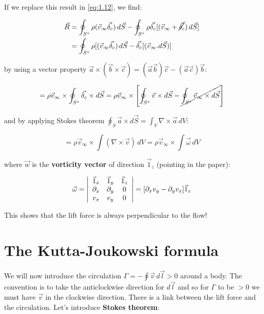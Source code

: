 			If we replace this result in \eqref{eq:1.12}, we find:
			
			\begin{equation}
			\begin{aligned}
			\vec{R} &= \oint _{S^*} \rho (\vec{v}_\infty \vec{\delta _c} ) \, d\vec{S} - \oint _{S^*} \rho \vec{\delta _c} [(\vec{v}_\infty + \cancel{\vec{\delta _c}} ) \, d\vec{S}] \\
			&=\oint _{S^*} \rho [(\vec{v}_\infty \vec{\delta _c}) \, d\vec{S} - \vec{\delta _c} [(\vec{v}_\infty . d\vec{S})]
			\end{aligned}
			\end{equation}
			
			by using a vector property $\vec{a} \times (\vec{b} \times \vec{c}) = (\vec{a} \vec{b})\vec{c} - (\vec{a}\vec{c})\vec{b}$:
			
			\begin{equation}
			= \rho \vec{v}_\infty \times \oint _{S^*} \vec{\delta _c} \times d\vec{S} = \rho \vec{v}_\infty \times \left[\oint _{S^*} \vec{v} \times d\vec{S} - \cancel{\oint _{S^*} \vec{v}_\infty \times d\vec{S}}\right]
			\end{equation}
			
			and by applying Stokes theorem $\oint _S \vec{a} \times d\vec{S} = \int _V \nabla \times \vec{a} \, dV$:
			
			\begin{equation}
			= \rho \vec{v}_\infty \times \int  (\nabla \times \vec{v})\, dV = \rho \vec{v}_\infty \times \int  \vec{\omega}\, dV
			\end{equation}
			
			where $\vec{w}$ is the \textbf{vorticity vector} of direction $\vec{1}_z$ (pointing in the paper):
			
			\begin{equation}
			\vec{\omega} = 
			\left| \begin{array}{ccc}
			\vec{1}_x & \vec{1}_y & \vec{1}_z \\ 
			\D _x & \D _y & 0 \\ 
			v_x & v_y & 0
			\end{array} 
			\right| 
			= [\D _x v_y - \D _y v_x] \vec{1}_z
			\end{equation}
			
			This shows that the lift force is always perpendicular to the flow!
		
	\section{The Kutta-Joukowski formula}
		We will now introduce the circulation $\Gamma = - \oint \vec{v} \, d\vec{l} >0$   around a body. The convention is to take the anticlockwise direction for $d\vec{l}$ and so for $\Gamma$ to be $>0$ we must have $\vec{v}$ in the clockwise direction. There is a link between the lift force and the circulation. Let's introduce \textbf{Stokes theorem}:
		
